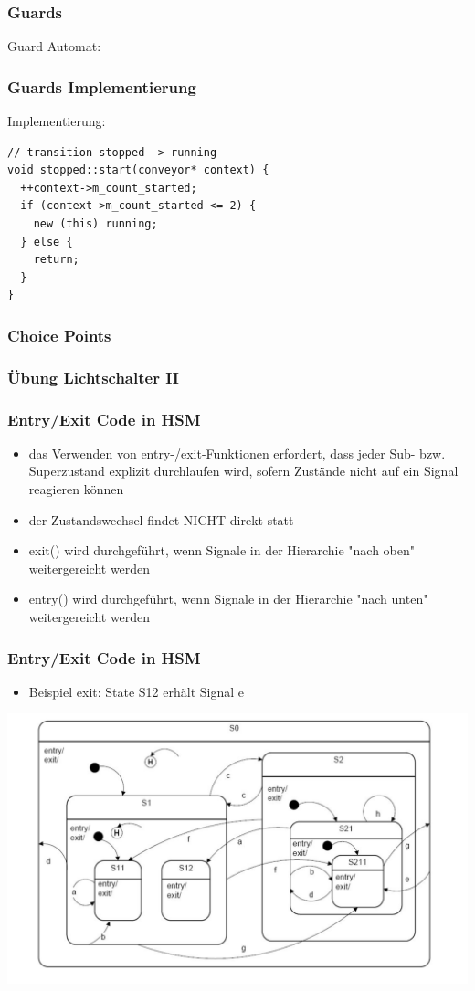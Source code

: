 \documentclass{beamer}
\begin{document}
\begin{frame}
 \frametitle{Guards}
 Guard Automat:
\end{frame}

\begin{frame}[fragile]
 \frametitle{Guards Implementierung}
 Implementierung:
  \begin{lstlisting}
// transition stopped -> running
void stopped::start(conveyor* context) {
  ++context->m_count_started;
  if (context->m_count_started <= 2) {
    new (this) running;
  } else {
    return;
  }
}
  \end{lstlisting}
\end{frame}

\begin{frame}
 \frametitle{Choice Points}
\end{frame}

\begin{frame}
 \frametitle{\"Ubung Lichtschalter II}
\end{frame}

\begin{frame}
	\frametitle{Entry/Exit Code in HSM }
	\begin{itemize}
		\item das Verwenden von entry-/exit-Funktionen erfordert, dass jeder Sub- bzw. Superzustand explizit durchlaufen wird, sofern Zust\"ande nicht auf ein Signal reagieren k\"onnen
		\item der Zustandswechsel findet NICHT direkt statt
		\item exit() wird durchgef\"uhrt, wenn Signale in der Hierarchie "nach oben" weitergereicht werden 
		\item entry() wird  durchgef\"uhrt, wenn Signale in der Hierarchie "nach unten" weitergereicht werden
	\end{itemize}
\end{frame}

\begin{frame}
	\frametitle{Entry/Exit Code in HSM }
	\begin{itemize}
		\item Beispiel exit: State S12 erh\"alt Signal e
	\end{itemize}
	\includegraphics[scale=.3]{img/beispiel_automat}
\end{frame}
\end{document}
